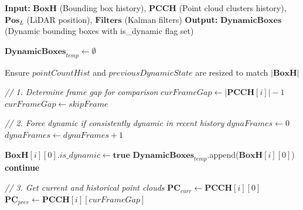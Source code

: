 \documentclass[14pt,a4paper]{article}
\begin{document}

\begin{algorithm}
\caption{Dynamic/Static Classification}
\begin{algorithmic}[1]

\State \textbf{Input:} $\mathbf{BoxH}$ (Bounding box history), $\mathbf{PCCH}$ (Point cloud clusters history), 
                        $\mathbf{Pos}_L$ (LiDAR position), $\mathbf{Filters}$ (Kalman filters)
\State \textbf{Output:} $\mathbf{DynamicBoxes}$ (Dynamic bounding boxes with is\_dynamic flag set)

\State $\mathbf{DynamicBoxes}_{temp} \gets \emptyset$

\State Ensure $pointCountHist$ and $previousDynamicState$ are resized to match $|\mathbf{BoxH}|$

    
    \State \textit{// 1. Determine frame gap for comparison}
        \State $curFrameGap \gets |\mathbf{PCCH}[i]| - 1$ 
    \Else
        \State $curFrameGap \gets skipFrame$ 
    \EndIf
    
    \State \textit{// 2. Force dynamic if consistently dynamic in recent history}
    \State $dynaFrames \gets 0$
                \State $dynaFrames \gets dynaFrames + 1$
            \EndIf
        \EndFor
    \EndIf
    
        \State $\mathbf{BoxH}[i][0].is\_dynamic \gets \textbf{true}$
        \State $\mathbf{DynamicBoxes}_{temp}$.append($\mathbf{BoxH}[i][0]$)
        \State \textbf{continue} 
    \EndIf
    
    \State \textit{// 3. Get current and historical point clouds}
    \State $\mathbf{PC}_{curr} \gets \mathbf{PCCH}[i][0]$ 
    \State $\mathbf{PC}_{prev} \gets \mathbf{PCCH}[i][curFrameGap]$ 
    

\end{algorithmic}
\end{algorithm}
\end{document}
